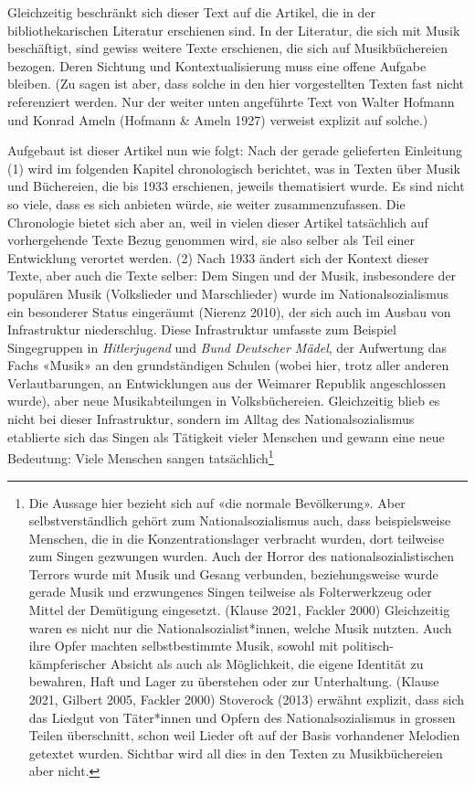 \documentclass[a4paper,
fontsize=11pt,
oneside,
numbers=noperiodatend,
parskip=half-,
bibliography=totoc,
final
]{scrartcl}
\begin{document}
Gleichzeitig beschränkt sich dieser Text auf die Artikel, die in der
bibliothekarischen Literatur erschienen sind. In der Literatur, die sich
mit Musik beschäftigt, sind gewiss weitere Texte erschienen, die sich
auf Musikbüchereien bezogen. Deren Sichtung und Kontextualisierung muss
eine offene Aufgabe bleiben. (Zu sagen ist aber, dass solche in den hier
vorgestellten Texten fast nicht referenziert werden. Nur der weiter
unten angeführte Text von Walter Hofmann und Konrad Ameln (Hofmann \&
Ameln 1927) verweist explizit auf solche.)

Aufgebaut ist dieser Artikel nun wie folgt: Nach der gerade gelieferten
Einleitung (1) wird im folgenden Kapitel chronologisch berichtet, was in
Texten über Musik und Büchereien, die bis 1933 erschienen, jeweils
thematisiert wurde. Es sind nicht so viele, dass es sich anbieten würde,
sie weiter zusammenzufassen. Die Chronologie bietet sich aber an, weil
in vielen dieser Artikel tatsächlich auf vorhergehende Texte Bezug
genommen wird, sie also selber als Teil einer Entwicklung verortet
werden. (2) Nach 1933 ändert sich der Kontext dieser Texte, aber auch
die Texte selber: Dem Singen und der Musik, insbesondere der populären
Musik (Volkslieder und Marschlieder) wurde im Nationalsozialismus ein
besonderer Status eingeräumt (Nierenz 2010), der sich auch im Ausbau von
Infrastruktur niederschlug. Diese Infrastruktur umfasste zum Beispiel
Singegruppen in \emph{Hitlerjugend} und \emph{Bund Deutscher Mädel}, der
Aufwertung das Fachs «Musik» an den grundständigen Schulen (wobei hier,
trotz aller anderen Verlautbarungen, an Entwicklungen aus der Weimarer
Republik angeschlossen wurde), aber neue Musikabteilungen in
Volksbüchereien. Gleichzeitig blieb es nicht bei dieser Infrastruktur,
sondern im Alltag des Nationalsozialismus etablierte sich das Singen als
Tätigkeit vieler Menschen und gewann eine neue Bedeutung: Viele Menschen
sangen tatsächlich\footnote{Die Aussage hier bezieht sich auf «die
  normale Bevölkerung». Aber selbstverständlich gehört zum
  Nationalsozialismus auch, dass beispielsweise Menschen, die in die
  Konzentrationslager verbracht wurden, dort teilweise zum Singen
  gezwungen wurden. Auch der Horror des nationalsozialistischen Terrors
  wurde mit Musik und Gesang verbunden, beziehungsweise wurde gerade
  Musik und erzwungenes Singen teilweise als Folterwerkzeug oder Mittel
  der Demütigung eingesetzt. (Klause 2021, Fackler 2000) Gleichzeitig
  waren es nicht nur die Nationalsozialist*innen, welche Musik nutzten.
  Auch ihre Opfer machten selbstbestimmte Musik, sowohl mit
  politisch-kämpferischer Absicht als auch als Möglichkeit, die eigene
  Identität zu bewahren, Haft und Lager zu überstehen oder zur
  Unterhaltung. (Klause 2021, Gilbert 2005, Fackler 2000) Stoverock
  (2013) erwähnt explizit, dass sich das Liedgut von Täter*innen und
  Opfern des Nationalsozialismus in grossen Teilen überschnitt, schon
  weil Lieder oft auf der Basis vorhandener Melodien getextet wurden.
  Sichtbar wird all dies in den Texten zu Musikbüchereien aber nicht.}
\end{document}
